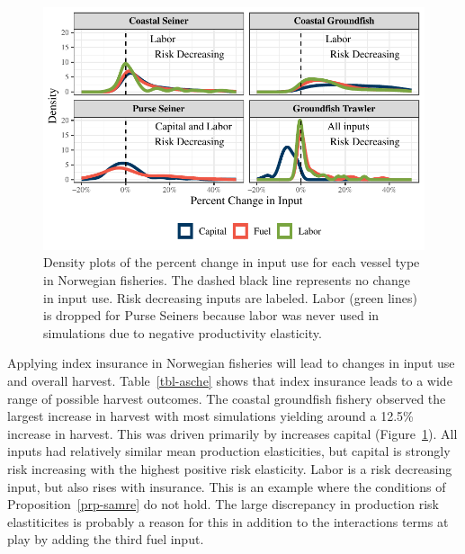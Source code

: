 \documentclass[
  letterpaper,
  DIV=11,
  numbers=noendperiod]{scrartcl}
\theoremstyle{plain}
\theoremstyle{plain}
\theoremstyle{remark}
\begin{document}
\begin{figure}

{\centering \includegraphics{ibi-behavior_files/figure-pdf/fig-asche-input-1.pdf}

}

\caption{\label{fig-asche-input}Density plots of the percent change in
input use for each vessel type in Norwegian fisheries. The dashed black
line represents no change in input use. Risk decreasing inputs are
labeled. Labor (green lines) is dropped for Purse Seiners because labor
was never used in simulations due to negative productivity elasticity.}

\end{figure}

Applying index insurance in Norwegian fisheries will lead to changes in
input use and overall harvest. Table~\ref{tbl-asche} shows that index
insurance leads to a wide range of possible harvest outcomes. The
coastal groundfish fishery observed the largest increase in harvest with
most simulations yielding around a 12.5\% increase in harvest. This was
driven primarily by increases capital (Figure~\ref{fig-asche-input}).
All inputs had relatively similar mean production elasticities, but
capital is strongly risk increasing with the highest positive risk
elasticity. Labor is a risk decreasing input, but also rises with
insurance. This is an example where the conditions of
Proposition~\ref{prp-samre} do not hold. The large discrepancy in
production risk elastiticites is probably a reason for this in addition
to the interactions terms at play by adding the third fuel input.
\end{document}
